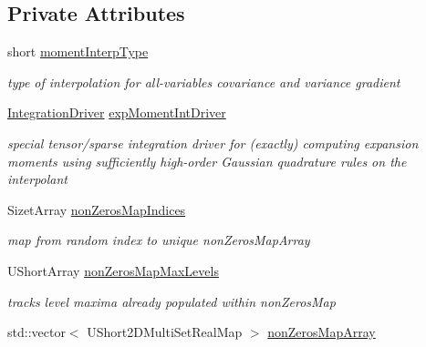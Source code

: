 \subsection*{Private Attributes}
\begin{DoxyCompactItemize}
\item 
short \hyperlink{classPecos_1_1SharedNodalInterpPolyApproxData_a2ec0986a45efa417a7c73b5dc828c42b}{moment\+Interp\+Type}\label{classPecos_1_1SharedNodalInterpPolyApproxData_a2ec0986a45efa417a7c73b5dc828c42b}

\begin{DoxyCompactList}\small\item\em type of interpolation for all-\/variables covariance and variance gradient \end{DoxyCompactList}\item 
\hyperlink{classPecos_1_1IntegrationDriver}{Integration\+Driver} \hyperlink{classPecos_1_1SharedNodalInterpPolyApproxData_af74bc5e2385433ae7f1c301fae5a8011}{exp\+Moment\+Int\+Driver}\label{classPecos_1_1SharedNodalInterpPolyApproxData_af74bc5e2385433ae7f1c301fae5a8011}

\begin{DoxyCompactList}\small\item\em special tensor/sparse integration driver for (exactly) computing expansion moments using sufficiently high-\/order Gaussian quadrature rules on the interpolant \end{DoxyCompactList}\item 
Sizet\+Array \hyperlink{classPecos_1_1SharedNodalInterpPolyApproxData_a62fe679f736de63f8cafd553b3600e9a}{non\+Zeros\+Map\+Indices}\label{classPecos_1_1SharedNodalInterpPolyApproxData_a62fe679f736de63f8cafd553b3600e9a}

\begin{DoxyCompactList}\small\item\em map from random index to unique non\+Zeros\+Map\+Array \end{DoxyCompactList}\item 
U\+Short\+Array \hyperlink{classPecos_1_1SharedNodalInterpPolyApproxData_a0b51566c2aedf5d11900b8c691914fe1}{non\+Zeros\+Map\+Max\+Levels}\label{classPecos_1_1SharedNodalInterpPolyApproxData_a0b51566c2aedf5d11900b8c691914fe1}

\begin{DoxyCompactList}\small\item\em tracks level maxima already populated within non\+Zeros\+Map \end{DoxyCompactList}\item 
std\+::vector$<$ U\+Short2\+D\+Multi\+Set\+Real\+Map $>$ \hyperlink{classPecos_1_1SharedNodalInterpPolyApproxData_a2f9386a177cfb18300410acf3e6021ed}{non\+Zeros\+Map\+Array}\label{classPecos_1_1SharedNodalInterpPolyApproxData_a2f9386a177cfb18300410acf3e6021ed}


\end{DoxyCompactItemize}
